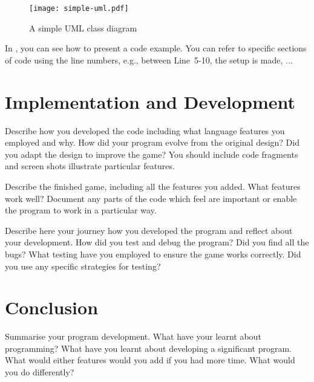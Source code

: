 \begin{figure}[H]
\centering\texttt{[image: simple-uml.pdf]}
\caption{\label{fig:uml}A simple UML class diagram}
\end{figure}

In , you can see how to present a code example.
You can refer to specific sections of code using the line numbers, e.g., between Line~5-10, the setup is made, ...

\begin{lstfloat}

\end{lstfloat}

\section{Implementation and Development}
Describe how you developed the code including what language features
you employed and why.
How did your program evolve from the original design?
Did you adapt the design to improve the game?
You should include code fragments and screen shots illustrate particular features.

Describe the finished game, including all the features you added.
What features work well?
Document any parts of the code which feel are important or
enable the program to work in a particular way.

Describe here your journey how you developed the program and reflect about your development.
How did you test and debug the program? Did you find all the bugs?
What testing have you employed to ensure the game works correctly. Did
you use any specific strategies for testing? 


\section{Conclusion}
Summarise your program development. What have your learnt about
programming? What have you learnt about developing a significant
program. What would either features would you add if you had more
time. What would you do differently?